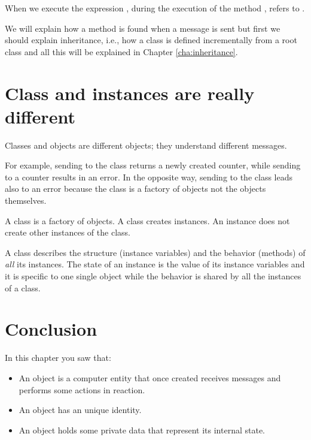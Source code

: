 \documentclass[10pt,twoside,english]{_support/latex/sbabook/sbabook}
\begin{document}
When we execute the expression , during the execution of the method ,  refers to . 

We will explain  how a method is found when a message is sent but first we should explain inheritance, i.e., how a class is defined incrementally from a root class and all this will be explained  in Chapter \ref{cha:inheritance}.
\section{Class and instances are really different}
Classes and objects are different objects; they understand different messages. 

For example, sending  to the  class returns a newly created counter, while sending  to a counter results in an error. In the opposite way, sending  to the class  leads also to an error because the class  is a factory of objects not the objects themselves. 

A class is a factory of objects. A class creates instances. An instance does not create other instances of the class.

\begin{coffee}
A class describes the structure (instance variables) and the behavior (methods) of \textit{all} its instances. The state of an instance is the value of its instance variables and it is specific to one single object while the behavior is shared by all the instances of a class.
\end{coffee}
\section{Conclusion}
In this chapter you saw that: 

\begin{itemize}
\item An object is a computer entity that once created receives messages and performs some actions in reaction.
\item An object has an unique identity.
\item An object holds some private data that represent its internal state.
\end{itemize}
\end{document}
